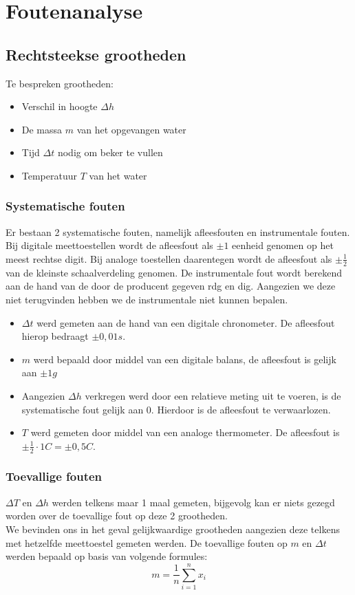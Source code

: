 \section{Foutenanalyse}

\subsection{Rechtsteekse grootheden}

Te bespreken grootheden:
\begin{itemize}
    \item Verschil in hoogte $\Delta h$
    \item De massa $m$ van het opgevangen water
    \item Tijd $\Delta t$ nodig om beker te vullen
    \item Temperatuur $T$ van het water
\end{itemize}

\subsubsection{Systematische fouten}
Er bestaan 2 systematische fouten, namelijk afleesfouten en instrumentale fouten. Bij digitale meettoestellen wordt de afleesfout als $\pm 1$ eenheid genomen op het meest rechtse digit. 
Bij analoge toestellen daarentegen wordt de afleesfout als $\pm \frac{1}{2}$ van de kleinste schaalverdeling genomen. De instrumentale fout wordt berekend aan de hand van de door de producent gegeven rdg en dig. Aangezien we deze niet terugvinden hebben we de instrumentale niet kunnen bepalen.
\begin{itemize}
    \item $\Delta t$ werd gemeten aan de hand van een digitale chronometer. De afleesfout hierop bedraagt $\pm 0,01 s$.
    \item $m$ werd bepaald door middel van een digitale balans, de afleesfout is gelijk aan $\pm 1g$
    \item Aangezien $\Delta h$ verkregen werd door een relatieve meting uit te voeren, is de systematische fout gelijk aan 0. Hierdoor is de afleesfout te verwaarlozen.
    \item $T$ werd gemeten door middel van een analoge thermometer. De afleesfout is $\pm \frac{1}{2} \cdot 1C = \pm 0,5C$.
\end{itemize} 




\subsubsection{Toevallige fouten}
$\Delta T$ en $\Delta h$ werden telkens maar 1 maal gemeten, bijgevolg kan er niets gezegd worden over de toevallige fout op deze 2 grootheden.
\\
We bevinden ons in het geval gelijkwaardige grootheden aangezien deze telkens met hetzelfde meettoestel gemeten werden.
De toevallige fouten op $m$ en $\Delta t$ werden bepaald op basis van volgende formules:
\begin{equation}
    m = \frac{1}{n} \sum\limits_{i=1}^n x_i
\end{equation}

